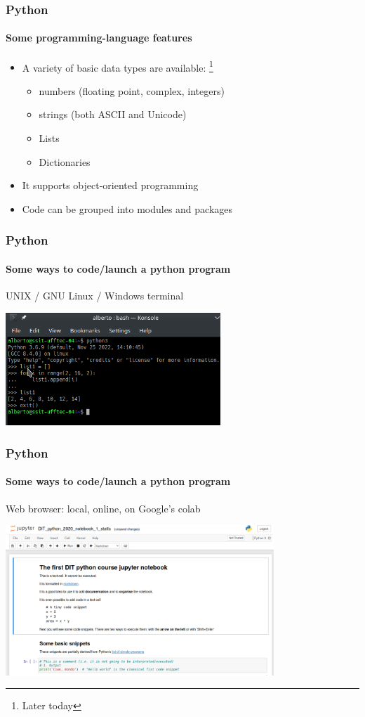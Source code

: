 \documentclass{beamer}
\begin{document}
\begin{frame}
\frametitle{Python}
\framesubtitle{Some programming-language features}

\begin{itemize}
\item A variety of basic data types are available:%
\footnote{Later today}
\begin{itemize}
 \item numbers (floating point, complex, integers)
 \item strings (both ASCII and Unicode)
 \item Lists
 \item Dictionaries
\end{itemize}			\pause 
 
\item It supports object-oriented programming

\item Code can be grouped into modules and packages
\end{itemize}
\end{frame}

\begin{frame}
\frametitle{Python}
\framesubtitle{Some ways to code/launch a python program}

UNIX / GNU Linux / Windows terminal

\begin{center}
 \includegraphics[width=81mm]{img/python_on_konsole.png}
\end{center}
\end{frame}

\begin{frame}
\frametitle{Python}
\framesubtitle{Some ways to code/launch a python program}

Web browser: local, online, on Google's colab

\begin{center}
 \includegraphics[width=101mm]{img/python_on_jupyter.png}
\end{center}
\end{frame}
\end{document}

